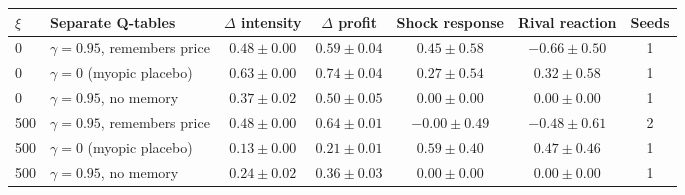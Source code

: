 \begin{tabular}{llccccc}
\toprule
$\xi$ & Separate Q-tables & $\Delta$ intensity & $\Delta$ profit & Shock response & Rival reaction & Seeds \\
\midrule
0 & $\gamma=0.95$, remembers price & $0.48 \pm 0.00$ & $0.59 \pm 0.04$ & $0.45 \pm 0.58$ & $-0.66 \pm 0.50$ & 1 \\
0 & $\gamma=0$ (myopic placebo) & $0.63 \pm 0.00$ & $0.74 \pm 0.04$ & $0.27 \pm 0.54$ & $0.32 \pm 0.58$ & 1 \\
0 & $\gamma=0.95$, no memory & $0.37 \pm 0.02$ & $0.50 \pm 0.05$ & $0.00 \pm 0.00$ & $0.00 \pm 0.00$ & 1 \\
500 & $\gamma=0.95$, remembers price & $0.48 \pm 0.00$ & $0.64 \pm 0.01$ & $-0.00 \pm 0.49$ & $-0.48 \pm 0.61$ & 2 \\
500 & $\gamma=0$ (myopic placebo) & $0.13 \pm 0.00$ & $0.21 \pm 0.01$ & $0.59 \pm 0.40$ & $0.47 \pm 0.46$ & 1 \\
500 & $\gamma=0.95$, no memory & $0.24 \pm 0.02$ & $0.36 \pm 0.03$ & $0.00 \pm 0.00$ & $0.00 \pm 0.00$ & 1 \\
\bottomrule
\end{tabular}